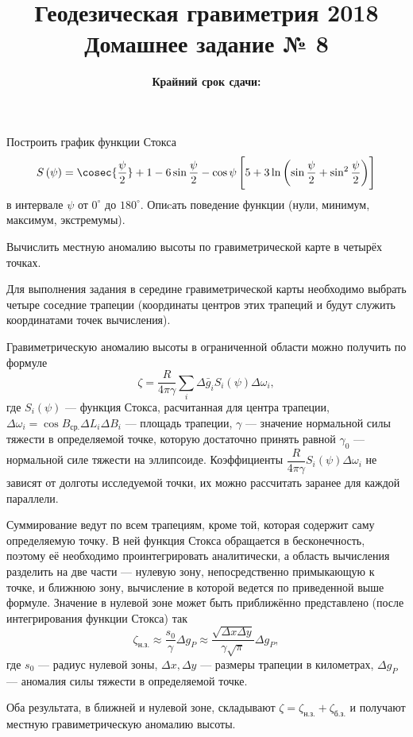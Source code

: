 \documentclass[11pt, a4paper,addpoints]{exam}
\title{{\Large Геодезическая гравиметрия 2018}\\ 
    {\bf\Large Домашнее задание № 8}}
\author{}
\date{\normalsize\bf Крайний срок сдачи: \DTMusedate{deadline}}
\theoremstyle{remark}
\begin{document}
\maketitle
\begin{questions}
    \question Построить график функции Стокса 
    \begin{equation*}
        S \left( \psi \right) = \cosec{\dfrac{\psi}{2}} + 1 - 6\sin{\dfrac{\psi}{2}} - 
        \cos{\psi}\left[ 5 + 3\ln\left( \sin{\dfrac{\psi}{2}} + \sin^2{\dfrac{\psi}{2}} \right) \right]
    \end{equation*}
    в интервале $\psi$ от
    $0^\circ$ до $180^\circ$. Опиcать поведение функции (нули, минимум, максимум, экстремумы).

    \question Вычислить местную аномалию высоты по гравиметрической карте в четырёх точках.

    Для выполнения задания в середине гравиметрической карты необходимо выбрать четыре соседние
    трапеции (координаты центров этих трапеций и будут служить координатами точек вычисления).

    Гравиметрическую аномалию высоты в ограниченной области можно получить по формуле
    \begin{equation*}
        \zeta = \dfrac{R}{4\pi\gamma} \sum\limits_{i} \Delta \bar{g}_i S_i\left( \psi \right)
        \Delta\omega_i,
    \end{equation*}
    где $S_i\left( \psi \right)$ --- функция Стокса, расчитанная для центра трапеции,
    $\Delta\omega_i = \cos{B_{\textrm{ср.}}}\Delta L_i \Delta B_i$ --- площадь трапеции, $\gamma$
    --- значение нормальной силы тяжести в определяемой точке, которую достаточно принять равной
    $\gamma_0$ --- нормальной силе тяжести на эллипсоиде.
    Коэффициенты $\dfrac{R}{4\pi\gamma} S_i\left(\psi \right)\Delta\omega_i$ не зависят от
    долготы исследуемой точки, их можно рассчитать заранее для каждой параллели.

    Суммирование ведут по всем трапециям, кроме той, которая содержит саму определяемую точку. В ней
    функция Стокса обращается в бесконечность, поэтому её необходимо проинтегрировать аналитически,
    а область вычисления разделить на две части --- нулевую зону, непосредственно примыкающую к точке, и
    ближнюю зону, вычисление в которой ведется по приведенной выше формуле. 
    Значение в нулевой зоне может быть приближённо представлено (после интегрирования функции
    Стокса) так
    \begin{equation*}
        \zeta_{\textrm{н.з.}} \approx \dfrac{s_0}{\gamma} \Delta g_P \approx \dfrac{\sqrt{\Delta x\Delta
        y}}{\gamma \sqrt{\pi}} \Delta g_P,
    \end{equation*}
    где $s_0$ --- радиус нулевой зоны, $\Delta x, \Delta y$ --- размеры трапеции в километрах,
    $\Delta g_P$ --- аномалия силы тяжести в определяемой точке. 

    Оба результата, в ближней и нулевой зоне, складывают $\zeta = \zeta_{\textrm{н.з.}} +
    \zeta_{\textrm{б.з.}}$ и получают местную гравиметрическую аномалию высоты.
\end{questions}
\end{document}
